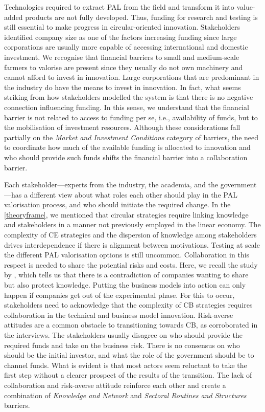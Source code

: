 Technologies required to extract PAL from the field and transform it into value-added products are not fully developed. Thus, funding for research and testing is still essential to make progress in circular-oriented innovation. Stakeholders identified company size as one of the factors increasing funding since large corporations are usually more capable of accessing international and domestic investment. We recognise that financial barriers to small and medium-scale farmers to valorise are present since they usually do not own machinery and cannot afford to invest in innovation. Large corporations that are predominant in the industry do have the means to invest in innovation. In fact, what seems striking from how stakeholders modelled the system is that there is no negative connection influencing funding. In this sense, we understand that the financial barrier is not related to access to funding per se, i.e., availability of funds, but to the mobilisation of investment resources. Although these considerations fall partially on the \textit{Market and Investment Conditions} category of barriers, the need to coordinate how much of the available funding is allocated to innovation and who should provide such funds shifts the financial barrier into a collaboration barrier. 

Each stakeholder---experts from the industry, the academia, and the government---has a different view about what roles each other should play in the PAL valorisation process, and who should initiate the required change. In the \cref{theoryframe}, we mentioned that circular strategies require linking knowledge and stakeholders in a manner not previously employed in the linear economy. The complexity of CE strategies and the dispersion of knowledge among stakeholders drives interdependence if there is alignment between motivations. Testing at scale the different PAL valorisation options is still uncommon. Collaboration in this respect is needed to share the potential risks and costs. Here, we recall the study by \cite{brown2019companies}, which tells us that there is a contradiction of companies wanting to share but also protect knowledge. Putting the business models into action can only happen if companies get out of the experimental phase. For this to occur, stakeholders need to acknowledge that the complexity of CB strategies requires collaboration in the technical and business model innovation. Risk-averse attitudes are a common obstacle to transitioning towards CB, as corroborated in the interviews. The stakeholders usually disagree on who should provide the required funds and take on the business risk. There is no consensus on who should be the initial investor, and what the role of the government should be to channel funds. What is evident is that most actors seem reluctant to take the first step without a clearer prospect of the results of the transition. The lack of collaboration and risk-averse attitude reinforce each other and create a combination of \textit{Knowledge and Network} and \textit{Sectoral Routines and Structures} barriers.

